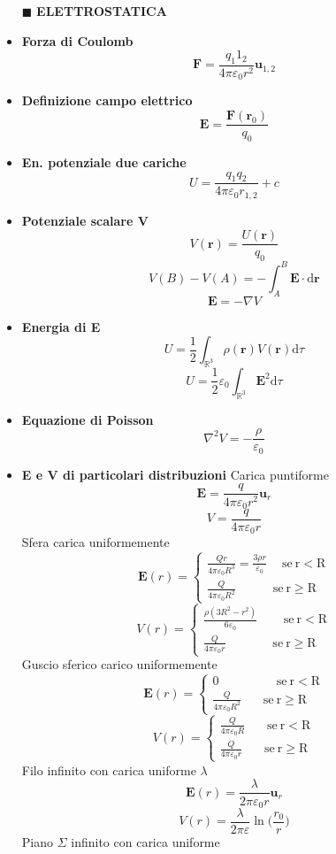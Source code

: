 \documentclass{book}
\newcommand{\g}{\textbf}
\newcommand{\h}{\mathbf}
\newcommand{\e}{\begin{equation}}
\newcommand{\ex}{\end{equation} }
\renewcommand{\it}{\item[$\cdot$]}
\begin{document}
\begin{multicols}{4}
\begin{itemize}
\item [$\blacksquare$] \g{ELETTROSTATICA}
    \it \g{Forza di Coulomb}
        \e{\h{F}=\frac{q_1 1_2}{4\pi\varepsilon_0 r^2}\h{u}_{1,2}} \ex
    \it \g{Definizione campo elettrico}
        \e{\h{E}=\frac{\h{F}(\h{r}_0)}{q_0}} \ex
    \it \g{En. potenziale due cariche}
        \e{U=\frac{q_1q_2}{4\pi\varepsilon_0r_{1,2}}+c} \ex
    \it \g{Potenziale scalare V}
        \e{V(\h{r})=\frac{U(\h{r})}{q_0}} \ex
        \e{V(B)-V(A)=-\int_A^B\h{E}\cdot \mathrm{d} \h{r}} \ex
        \e{\h{E}=-\nabla V} \ex
    \it \g{Energia di E}
        \e{U=\frac{1}{2} \int_{\mathbb{R}^3} \rho(\h{r}) V(\h{r}) \mathrm{d}\tau} \ex
        \e{U=\frac{1}{2}\varepsilon_0\int_{\mathbb{R}^3}\h{E}^2 \mathrm{d}\tau} \ex
    \it \g{Equazione di Poisson}
        \e{\nabla^2V=-\frac{\rho}{\varepsilon_0}} \ex
    \it \g{E e V di particolari distribuzioni}
    Carica puntiforme 
        \e{\h{E}=\frac{q}{4\pi\varepsilon_0 r^2}\h{u}_{r}} \ex
        \e{V=\frac{q}{4\pi\varepsilon_0 r}} \ex
    Sfera carica uniformemente
        \e{ \h{E}(r)=\begin{cases} 
        \frac{Qr}{4\pi\varepsilon_0 R^3}=\frac{3 \rho r}{\varepsilon_0} \quad \mathrm{\ se\ r<R}\\
        \frac{Q}{4\pi\varepsilon_0 R^2} \quad \ \ \ \ \ \ \ \ \mathrm{\ se\ r\geq R}\end{cases} } \ex
        \e{ V(r)=\begin{cases} 
        \frac{\rho (3R^2-r^2)}{6\varepsilon_0 } \quad \ \ \ \ \mathrm{\ se\ r<R}\\
        \frac{Q}{4\pi\varepsilon_0 r} \qquad \ \ \ \ \ \ \ \mathrm{\ se\ r\geq R}\end{cases} } \ex
    Guscio sferico carico uniformemente
        \e{ \h{E}(r)=\begin{cases} 
        0 \qquad \qquad \ \ \mathrm{\ se\ r<R}\\
        \frac{Q}{4\pi\varepsilon_0 R^2} \ \ \ \ \ \ \ \mathrm{\ se\ r\geq R}\end{cases} } \ex
        \e{ V(r)=\begin{cases} 
        \frac{Q}{4\pi\varepsilon_0 R} \ \ \ \ \ \ \ \mathrm{\ se\ r<R}\\
        \frac{Q}{4\pi\varepsilon_0 r} \ \ \ \ \ \ \ \mathrm{\ se\ r\geq R}\end{cases} } \ex
    Filo infinito con carica uniforme $\lambda$
        \e{\h{E}(r)=\frac{\lambda}{2\pi\varepsilon_0 r} \h{u}_r} \ex
        \e{V(r)=\frac{\lambda}{2\pi\varepsilon} \ln \biggl(\frac{r_0}{r}\biggr)} \ex
    Piano $\Sigma$ infinito con carica uniforme

\end{itemize}
\end{multicols}
\end{document}
